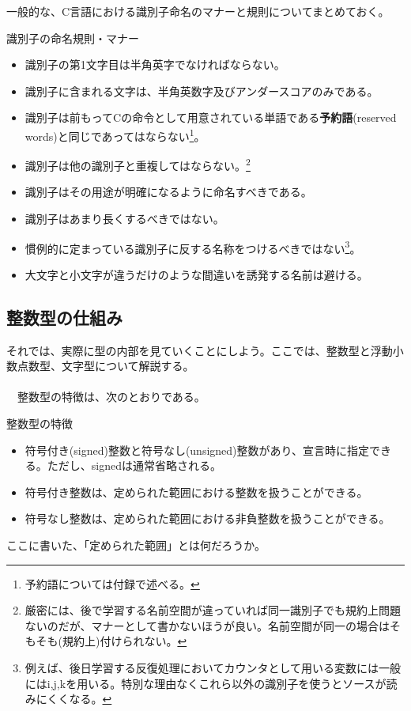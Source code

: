 一般的な、C言語における識別子命名のマナーと規則についてまとめておく。
\begin{itembox}[l]{識別子の命名規則・マナー}
\begin{itemize}
\item 識別子の第1文字目は半角英字でなければならない。
\item 識別子に含まれる文字は、半角英数字及びアンダースコアのみである。
\item 識別子は前もってCの命令として用意されている単語である\textbf{予約語}(reserved words)と同じであってはならない\footnote{予約語については付録で述べる。}。
\item 識別子は他の識別子と重複してはならない。\footnote{厳密には、後で学習する名前空間が違っていれば同一識別子でも規約上問題ないのだが、マナーとして書かないほうが良い。名前空間が同一の場合はそもそも(規約上)付けられない。}
\end{itemize}
\begin{itemize}
\item 識別子はその用途が明確になるように命名すべきである。
\item 識別子はあまり長くするべきではない。
\item 慣例的に定まっている識別子に反する名称をつけるべきではない\footnote{例えば、後日学習する反復処理においてカウンタとして用いる変数には一般にはi,j,kを用いる。特別な理由なくこれら以外の識別子を使うとソースが読みにくくなる。}。
\item 大文字と小文字が違うだけのような間違いを誘発する名前は避ける。
\end{itemize}
\end{itembox}

\subsection{整数型の仕組み}
それでは、実際に型の内部を見ていくことにしよう。ここでは、整数型と浮動小数点数型、文字型について解説する。\\ \\
　整数型の特徴は、次のとおりである。
\begin{itembox}[l]{整数型の特徴}
\begin{itemize}
\item 符号付き(signed)整数と符号なし(unsigned)整数があり、宣言時に指定できる。ただし、signedは通常省略される。
\item 符号付き整数は、定められた範囲における整数を扱うことができる。
\item 符号なし整数は、定められた範囲における非負整数を扱うことができる。
\end{itemize}
\end{itembox}
ここに書いた、「定められた範囲」とは何だろうか。

